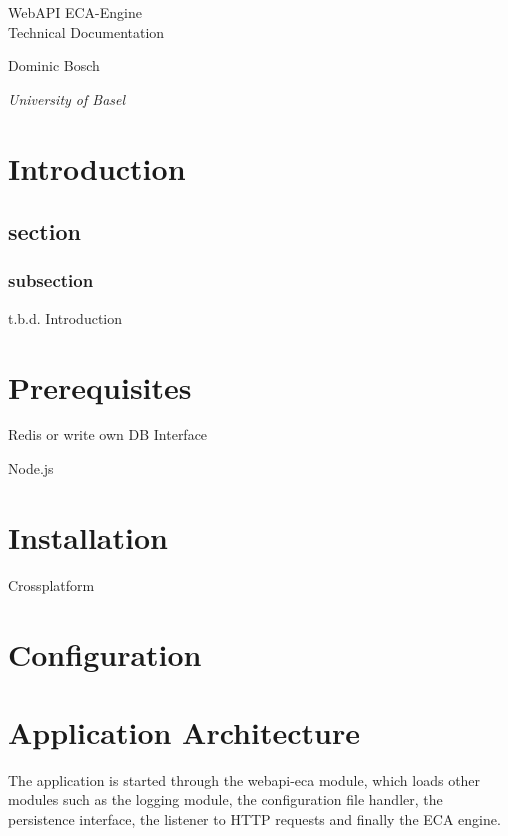 \documentclass{article}
\newcommand*{\createTitlePage}{\begingroup
\centering
\vspace*{6\baselineskip}

{\Huge WebAPI ECA-Engine}\\[4\baselineskip]

{\LARGE Technical Documentation} \\[\baselineskip]

\vspace*{25\baselineskip}

{Dominic Bosch\par}
{\itshape University of Basel\par}




\endgroup}
\begin{document}
\clearpage\createTitlePage
\thispagestyle{empty}

\newpage
\tableofcontents
\newpage


\section{Introduction}
\subsection{section}
\subsubsection{subsection}
t.b.d.
Introduction


\section{Prerequisites}
Redis or write own DB Interface

Node.js

\section{Installation}
Crossplatform

\section{Configuration}

\section{Application Architecture}
The application is started through the webapi-eca module, which loads other modules such as the logging module, the configuration file handler, the persistence interface, the listener to HTTP requests and finally the ECA engine.
\end{document}

